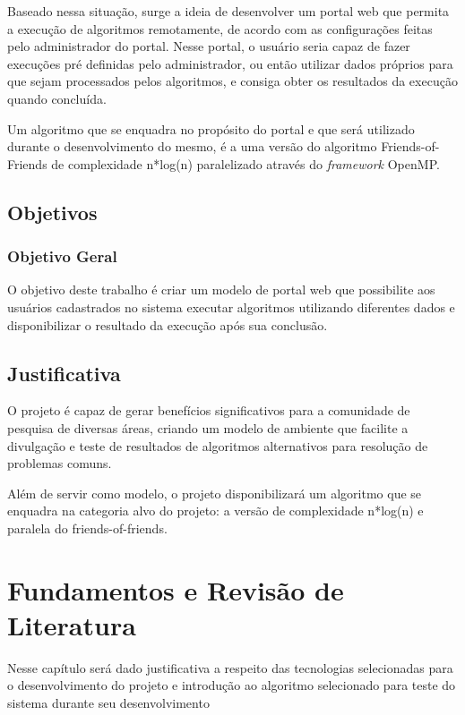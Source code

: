 \documentclass[tg]{mdtufsm}
\begin{document}
Baseado nessa situação, surge a ideia de desenvolver um portal web que permita a execução de algoritmos remotamente, de acordo com as configurações feitas pelo administrador do portal. Nesse portal, o usuário seria capaz de fazer execuções pré definidas pelo administrador, ou então utilizar dados próprios para que sejam processados pelos algoritmos, e consiga obter os resultados da execução quando concluída.

Um algoritmo que se enquadra no propósito do portal e que será utilizado durante o desenvolvimento do mesmo, é a uma versão do algoritmo Friends-of-Friends de complexidade n*log(n) paralelizado através do \emph{framework} OpenMP.

\section{Objetivos}

\subsection{Objetivo Geral}

O objetivo deste trabalho é criar um modelo de portal web que possibilite aos usuários cadastrados no sistema executar algoritmos utilizando diferentes dados e disponibilizar o resultado da execução após sua conclusão.

\section{Justificativa}

O projeto é capaz de gerar benefícios significativos para a comunidade de pesquisa de diversas áreas, criando um modelo de ambiente que facilite a divulgação e teste de resultados de algoritmos alternativos para resolução de problemas comuns.

Além de servir como modelo, o projeto disponibilizará um algoritmo que se enquadra na categoria alvo do projeto: a versão de complexidade n*log(n) e paralela do friends-of-friends.

\chapter{Fundamentos e Revisão de Literatura}
Nesse capítulo será dado justificativa a respeito das tecnologias selecionadas para o desenvolvimento do projeto e introdução ao algoritmo selecionado para teste do sistema durante seu desenvolvimento
\end{document}
